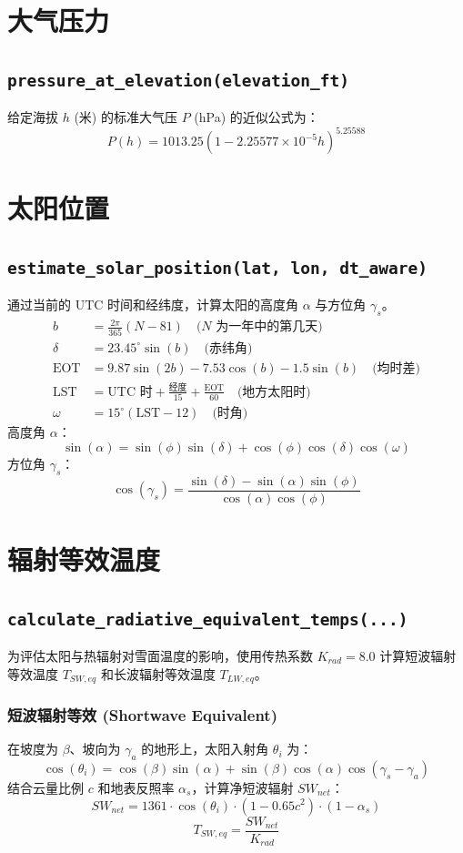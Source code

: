 \documentclass[11pt]{article}
\begin{document}
\section{大气压力}
\subsection{\texttt{pressure\_at\_elevation(elevation\_ft)}}
给定海拔 $h$ (米) 的标准大气压 $P$ (hPa) 的近似公式为：
\[
P(h) = 1013.25 \left( 1 - 2.25577 \times 10^{-5} h \right)^{5.25588}
\]

\section{太阳位置}
\subsection{\texttt{estimate\_solar\_position(lat, lon, dt\_aware)}}
通过当前的 UTC 时间和经纬度，计算太阳的高度角 $\alpha$ 与方位角 $\gamma_s$。
\begin{align*}
b &= \frac{2\pi}{365}(N - 81) \quad \text{($N$ 为一年中的第几天)} \\
\delta &= 23.45^\circ \sin(b) \quad \text{(赤纬角)} \\
\text{EOT} &= 9.87 \sin(2b) - 7.53 \cos(b) - 1.5 \sin(b) \quad \text{(均时差)} \\
\text{LST} &= \text{UTC 时} + \frac{\text{经度}}{15} + \frac{\text{EOT}}{60} \quad \text{(地方太阳时)} \\
\omega &= 15^\circ (\text{LST} - 12) \quad \text{(时角)}
\end{align*}
高度角 $\alpha$：
\[
\sin(\alpha) = \sin(\phi)\sin(\delta) + \cos(\phi)\cos(\delta)\cos(\omega)
\]
方位角 $\gamma_s$：
\[
\cos(\gamma_s) = \frac{\sin(\delta) - \sin(\alpha)\sin(\phi)}{\cos(\alpha)\cos(\phi)}
\]

\section{辐射等效温度}
\subsection{\texttt{calculate\_radiative\_equivalent\_temps(...)}}
为评估太阳与热辐射对雪面温度的影响，使用传热系数 $K_{rad} = 8.0$ 计算短波辐射等效温度 $T_{SW,eq}$ 和长波辐射等效温度 $T_{LW,eq}$。

\subsubsection*{短波辐射等效 (Shortwave Equivalent)}
在坡度为 $\beta$、坡向为 $\gamma_a$ 的地形上，太阳入射角 $\theta_i$ 为：
\[
\cos(\theta_i) = \cos(\beta)\sin(\alpha) + \sin(\beta)\cos(\alpha)\cos(\gamma_s - \gamma_a)
\]
结合云量比例 $c$ 和地表反照率 $\alpha_s$，计算净短波辐射 $SW_{net}$：
\[
SW_{net} = 1361 \cdot \cos(\theta_i) \cdot (1 - 0.65 c^2) \cdot (1 - \alpha_s)
\]
\[
T_{SW,eq} = \frac{SW_{net}}{K_{rad}}
\]
\end{document}
